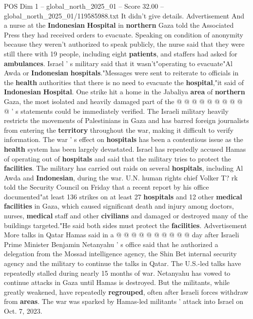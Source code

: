 \begin{textsample}{POS Dim 1 – global\_north\_2025\_01 – Score 32.00 – global\_north\_2025\_01/119585988.txt}
It didn't give details.
Advertisement And a nurse at the \textbf{Indonesian} \textbf{Hospital} in \textbf{northern} Gaza told the Associated Press they had received orders to evacuate.
Speaking on condition of anonymity because they weren't authorized to speak publicly, the nurse said that they were still there with 19 people, including eight \textbf{patients}, and staffers had asked for \textbf{ambulances}.
Israel ' s military said that it wasn't"operating to evacuate"Al Awda or \textbf{Indonesian} \textbf{hospitals}."Messages were sent to reiterate to officials in the \textbf{health} authorities that there is no need to evacuate the \textbf{hospital},"it said of \textbf{Indonesian} \textbf{Hospital}.
One strike hit a home in the Jabaliya \textbf{area} of \textbf{northern} Gaza, the most isolated and heavily damaged part of the @ @ @ @ @ @ @ @ @ @ ' s statements could be immediately verified.
The Israeli military heavily restricts the movements of Palestinians in Gaza and has barred foreign journalists from entering the \textbf{territory} throughout the war, making it difficult to verify information.
The war ' s effect on \textbf{hospitals} has been a contentious issue as the \textbf{health} system has been largely devastated.
Israel has repeatedly accused Hamas of operating out of \textbf{hospitals} and said that the military tries to protect the \textbf{facilities}.
The military has carried out raids on several \textbf{hospitals}, including Al Awda and \textbf{Indonesian}, during the war.
U.N. human rights chief Volker T? rk told the Security Council on Friday that a recent report by his office documented"at least 136 strikes on at least 27 \textbf{hospitals} and 12 other \textbf{medical} \textbf{facilities} in Gaza, which caused significant death and injury among doctors, nurses, \textbf{medical} staff and other \textbf{civilians} and damaged or destroyed many of the buildings targeted."He said both sides must protect the \textbf{facilities}.
Advertisement More talks in Qatar Hamas said in a @ @ @ @ @ @ @ @ @ @ day after Israeli Prime Minister Benjamin Netanyahu ' s office said that he authorized a delegation from the Mossad intelligence agency, the Shin Bet internal security agency and the military to continue the talks in Qatar.
The U.S.-led talks have repeatedly stalled during nearly 15 months of war.
Netanyahu has vowed to continue attacks in Gaza until Hamas is destroyed.
But the militants, while greatly weakened, have repeatedly \textbf{regrouped}, often after Israeli forces withdraw from \textbf{areas}.
The war was sparked by Hamas-led militants ' attack into Israel on Oct. 7, 2023.

\end{textsample}
